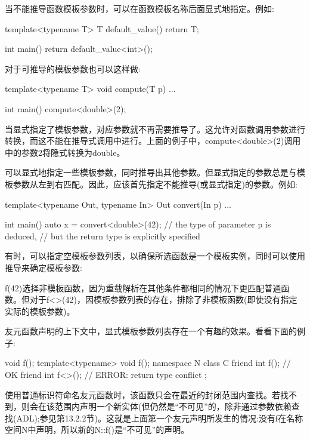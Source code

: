 当不能推导函数模板参数时，可以在函数模板名称后面显式地指定。例如:

\begin{cpp}
template<typename T> T default_value()
{
	return T{};
}

int main()
{
	return default_value<int>();
}
\end{cpp}

对于可推导的模板参数也可以这样做:

\begin{cpp}
template<typename T> void compute(T p)
{
	...
}

int main()
{
	compute<double>(2);
}
\end{cpp}

当显式指定了模板参数，对应参数就不再需要推导了。这允许对函数调用参数进行转换，而这不能在推导式调用中进行。上面的例子中，compute<double>(2)调用中的参数2将隐式转换为double。

可以显式地指定一些模板参数，同时推导出其他参数。但显式指定的参数总是与模板参数从左到右匹配。因此，应该首先指定不能推导(或显式指定)的参数。例如:

\begin{cpp}
template<typename Out, typename In>
Out convert(In p)
{
	...
}

int main() {
	auto x = convert<double>(42); // the type of parameter p is deduced,
	// but the return type is explicitly specified
}
\end{cpp}

有时，可以指定空模板参数列表，以确保所选函数是一个模板实例，同时可以使用推导来确定模板参数:


f(42)选择非模板函数，因为重载解析在其他条件都相同的情况下更匹配普通函数。但对于f<>(42)，因模板参数列表的存在，排除了非模板函数(即使没有指定实际的模板参数)。

友元函数声明的上下文中，显式模板参数列表存在一个有趣的效果。看看下面的例子:

\begin{cpp}
void f();
template<typename> void f();
namespace N {
	class C {
		friend int f(); // OK
		friend int f<>(); // ERROR: return type conflict
	};
}
\end{cpp}

使用普通标识符命名友元函数时，该函数只会在最近的封闭范围内查找。若找不到，则会在该范围内声明一个新实体(但仍然是“不可见”的，除非通过参数依赖查找(ADL);参见第13.2.2节)。这就是上面第一个友元声明所发生的情况:没有f在名称空间N中声明，所以新的N::f()是“不可见”的声明。

